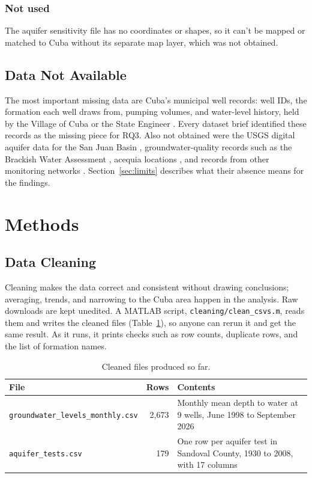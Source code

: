 \documentclass[10pt,twocolumn,letterpaper]{article}
\begin{document}
\subsubsection{Not used}
The aquifer sensitivity file \citep{nmwd_sensitivity} has no coordinates or shapes, so it can't be
mapped or matched to Cuba without its separate map layer, which was not obtained.

\subsection{Data Not Available}
The most important missing data are Cuba's municipal well records: well IDs, the formation each
well draws from, pumping volumes, and water-level history, held by the Village of Cuba or the
State Engineer \citep{nmose}. Every dataset brief identified these records as the missing piece for
RQ3. Also not obtained were the USGS digital aquifer data for the San Juan Basin
\citep{usgs_rasa_sjb}, groundwater-quality records such as the Brackish Water Assessment
\citep{nmbg_bwa}, acequia locations \citep{isc_acequias}, and records from other monitoring
networks \citep{ngwmn,cgmn}. Section~\ref{sec:limits} describes what their absence means for the
findings.

\section{Methods}\label{sec:methods}
\subsection{Data Cleaning}
Cleaning makes the data correct and consistent without drawing conclusions; averaging, trends,
and narrowing to the Cuba area happen in the analysis. Raw downloads are kept unedited. A MATLAB
script, \texttt{cleaning/clean\_csvs.m}, reads them and writes the cleaned files
(Table~\ref{tab:cleaned}), so anyone can rerun it and get the same result. As it runs, it prints
checks such as row counts, duplicate rows, and the list of formation names.

\begin{table}[t]
  \caption{Cleaned files produced so far.}
  \label{tab:cleaned}
  \footnotesize
  \begin{tabularx}{\linewidth}{@{}>{\raggedright}p{1.15in}r>{\raggedright\arraybackslash}X@{}}
    \toprule
    \textbf{File} & \textbf{Rows} & \textbf{Contents} \\
    \midrule
    \texttt{groundwater\_levels\_monthly.csv} & 2,673 & Monthly mean depth to water at
      9 wells, June 1998 to September 2026 \\
    \texttt{aquifer\_tests.csv} & 179 & One row per aquifer test in Sandoval County, 1930 to
      2008, with 17 columns \\
    \bottomrule
  \end{tabularx}
\end{table}
\end{document}

